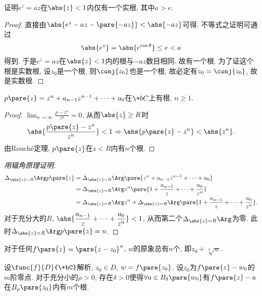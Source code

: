 \documentclass[../ComplexVariable.tex]{subfiles}
\begin{document}
\begin{sample}
    \begin{ex}
        证明$e^z = az$在$\abs{z} < 1$内仅有一个实根, 其中$a > e$.
    \end{ex}
    \begin{proof}
        直接由$\abs{e^z - az - \pare{-az}} < \abs{-az}$可得. 不等式之证明可通过
        \[ \abs{e^z} = \abs{e^{\cos\theta}} \le e < a \]
        得到. 于是$e^z = az$在$\abs{z} < 1$内的根与$-az$数目相同. 故有一个根. 为了证这个根是实数根, 设$z_0$是一个根, 则$\conj{z_0}$也是一个根, 故必定有$z_0 = \conj{z_0}$, 故是实数根.
    \end{proof}
\end{sample}
\begin{sample}
    \begin{ex}
        $p\pare{z} = z^n + a_{n-1}z^{n-1} + \cdots + a_0$在$\+bC$上有根, $n\ge 1$.
    \end{ex}
    \begin{proof}
        $\displaystyle \lim_{n\rightarrow \infty} \frac{p-z^n}{z^n} = 0$, 从而$\abs{z}\ge R$时
        \[ \abs{\frac{p\pare{z} - z^n}{z^n}} < 1 \Rightarrow \abs{p\pare{z} - z^n} < \abs{z^n}. \]
        由Rouch\'e定理, $p\pare{z}$在$z<R$内有$n$个根.
    \end{proof}
    \begin{proof}[用辐角原理证明]
        \begin{align*}
            \Delta_{\abs{z} = R} \Arg p\pare{z} &= \Delta_{\abs{z} = R} \Arg \pare{z^n + a_{n-1}z^{n-1}+\cdots + a_0} \\
            &= \Delta_{\abs{z} = R} \Arg z^n \pare{1 + \frac{a_{n-1}}{z}+\cdots + \frac{a_0}{z^n}} \\
            &= \Delta_{\abs{z} = R} \Arg z^n + \Delta_{\abs{z} = R} \Arg \pare{1 + \frac{a_{n-1}}{z}+\cdots + \frac{a_0}{z^n}}.
        \end{align*}
        对于充分大的$R$, $\displaystyle \abs{\frac{a_{n-1}}{z}+\cdots + \frac{a_0}{z^n}} < 1$, 从而第二个$\Delta_{\abs{z}=R}\Arg$为零. 此时$\Delta_{\abs{z} = R} \Arg p\pare{z} = n$.
    \end{proof}
\end{sample}
\begin{ex}
    对于任何$f\pare{z} = \pare{z-z_0}^n$, $w$的原象总有$n$个, 即$z_0 + \sqrt[n]{w}$.
\end{ex}
\begin{figure}
    \centering
\end{figure}
\begin{theorem}
    \label{thm:多重解}
    设$\func{f}{D}{\+bC}$解析, $z_0 \in D$, $w = f\pare{z_0}$. 设$z_0$为$f\pare{z} - w_0$的$m$阶零点. 对于充分小的$\rho > 0$, 存在$\delta>0$使得$\forall a\in B_\delta\pare{w_0}$有$f\pare{z} - a$在$B_\rho\pare{z_0}$内有$m$个根.
\end{theorem}
\end{document}
